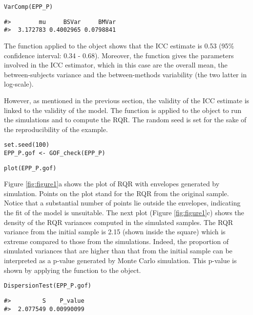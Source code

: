 \begin{verbatim}
VarComp(EPP_P)
\end{verbatim}

\begin{verbatim}
#>        mu     BSVar     BMVar
#>  3.172783 0.4002965 0.0798841
\end{verbatim}

The function  applied to the  object shows that the ICC estimate is 0.53 (95\% confidence interval: 0.34 - 0.68). Moreover, the function  gives the parameters involved in the ICC estimator, which in this case are the overall mean, the between-subjects variance and the between-methods variability (the two latter in log-scale).

However, as mentioned in the previous section, the validity of the ICC estimate is linked to the validity of the model. The function  is applied to the  object to run the simulations and to compute the RQR. The random seed is set for the sake of the reproducibility of the example.

\begin{verbatim}
set.seed(100)
EPP_P.gof <- GOF_check(EPP_P)
\end{verbatim}

\begin{verbatim}
plot(EPP_P.gof)
\end{verbatim}

Figure \ref{fig:figure1}a shows the plot of RQR with envelopes generated by simulation. Points on the plot stand for the RQR from the original sample. Notice that a substantial number of points lie outside the envelopes, indicating the fit of the model is unsuitable. The next plot (Figure \ref{fig:figure1}c) shows the density of the RQR variances computed in the simulated samples. The RQR variance from the initial sample is 2.15 (shown inside the square) which is extreme compared to those from the simulations. Indeed, the proportion of simulated variances that are higher than that from the initial sample can be interpreted as a p-value generated by Monte Carlo simulation. This p-value is shown by applying the function  to the  object.

\begin{verbatim}
DispersionTest(EPP_P.gof)
\end{verbatim}

\begin{verbatim}
#>         S    P_value
#>  2.077549 0.00990099
\end{verbatim}

